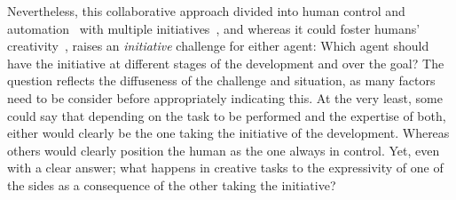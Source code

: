 
Nevertheless, this collaborative approach divided into human control and automation~\cite{Horvitz99-mixedInit} with multiple initiatives~\cite{Allen99-MIinteraction,novick97-mixedInit}, and whereas it could foster humans' creativity~\cite{yannakakis2014micc}, raises an \emph{initiative} challenge for either agent: Which agent should have the initiative at different stages of the development and over the goal? The question reflects the diffuseness of the challenge and situation, as many factors need to be consider before appropriately indicating this. At the very least, some could say that depending on the task to be performed and the expertise of both, either would clearly be the one taking the initiative of the development. Whereas others would clearly position the human as the one always in control. Yet, even with a clear answer; what happens in creative tasks to the expressivity of one of the sides as a consequence of the other taking the initiative? 




